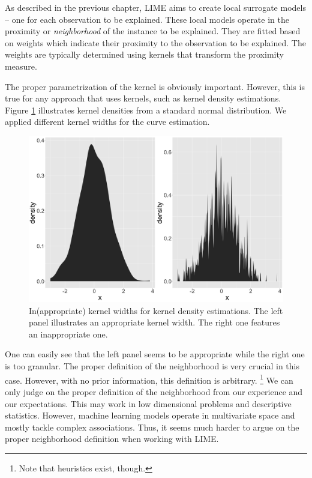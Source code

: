 \documentclass[]{krantz}
\begin{document}
As described in the previous chapter, LIME aims to create local
surrogate models -- one for each observation to be explained. These
local models operate in the proximity or \emph{neighborhood} of the
instance to be explained. They are fitted based on weights which
indicate their proximity to the observation to be explained. The weights
are typically determined using kernels that transform the proximity
measure.

The proper parametrization of the kernel is obviously important.
However, this is true for any approach that uses kernels, such as kernel
density estimations. Figure \ref{fig:lime-fig1} illustrates kernel
densities from a standard normal distribution. We applied different
kernel widths for the curve estimation.

\begin{figure}

{\centering \includegraphics[width=0.99\linewidth]{images/04-09-01} 

}

\caption{In(appropriate) kernel widths for kernel density estimations. The left panel illustrates an appropriate kernel width. The right one features an inappropriate one.}\label{fig:lime-fig1}
\end{figure}

One can easily see that the left panel seems to be appropriate while the
right one is too granular. The proper definition of the neighborhood is
very crucial in this case. However, with no prior information, this
definition is arbitrary. \footnote{Note that heuristics exist, though.}
We can only judge on the proper definition of the neighborhood from our
experience and our expectations. This may work in low dimensional
problems and descriptive statistics. However, machine learning models
operate in multivariate space and mostly tackle complex associations.
Thus, it seems much harder to argue on the proper neighborhood
definition when working with LIME.
\end{document}
